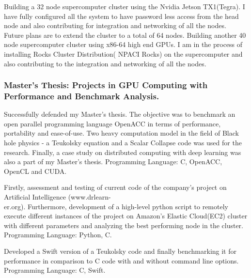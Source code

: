 \documentclass{Mihir_Kavatkar-Resume}
\begin{document}
		\vspace*{-0.5em}
		\workitems
		{Building a 32 node supercomputer cluster using the Nvidia Jetson TX1(Tegra). I have fully configured all the system to have password less access from the head node and also contributing for integration and networking of all the nodes. Future plans are to extend the cluster to a total of 64 nodes. }
		{Building another 40 node supercomputer cluster using x86-64 high end GPUs. I am in the process of installing Rocks Cluster Distribution( NPACI Rocks) on the supercomputer and also contributing to the integration and networking of all the nodes.}
		
		\vspace*{-0.5em}
		\subsubsection{Master's Thesis: Projects in GPU Computing with Performance and Benchmark Analysis.}
		\workitems
		{Successfully defended my Master's thesis. The objective was to benchmark an open parallel programming language OpenACC in terms of performance, portability and ease-of-use. Two heavy computation model in the field of Black hole physics - a Teukolsky equation and a Scalar Collapse code was used for the research. Finally, a case study on distributed computing with deep learning was also a part of my Master's thesis.}
		{Programming Language: C, OpenACC, OpenCL and CUDA.}
		
		\vspace*{-0.5em}
		\workitems
		{Firstly, assessment and testing of current code of the company's project on Artificial Intelligence (www.drlearn-\\er.org). Furthermore, development of a high-level python script to remotely execute different instances of the project on Amazon's Elastic Cloud(EC2) cluster with different parameters and analyzing the best performing node in the cluster.}
		{Programming Language: Python, C.}
		
		\vspace*{-0.5em}
		\workitems
		{Developed a Swift version of a Teukolsky code and finally benchmarking it for performance in comparison to C code with and without command line options.}
		{Programming Language: C, Swift.}
		
\end{document}
